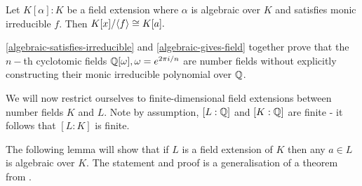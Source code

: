 \begin{lemma}\label{algebraic-gives-field} 
Let $K[\alpha]:K$ be a field extension where $\alpha$ is algebraic over $K$ and satisfies monic irreducible $f$. Then $K[x]/\langle f \rangle \cong K[a].$



\end{lemma}


\begin{remark}
\cref{algebraic-satisfies-irreducible} and \cref{algebraic-gives-field} together prove that the $n-$th cyclotomic fields $\mathbb{Q}[\omega],\omega=e^{2\pi i/n}$ are number fields without explicitly constructing their monic irreducible polynomial over $\mathbb{Q}$. 
\end{remark}

We will now restrict ourselves to finite-dimensional  field extensions between number fields $K$ and $L$. Note by assumption, $[L:\mathbb{Q}]$ and $[K:\mathbb{Q}]$ are finite - it follows that $[L:K]$ is finite.

The following lemma will show that if $L$ is a field extension of $K$ then any $a\in L$ is algebraic over $K$. The statement and proof is a generalisation of a theorem from \cite{NumberFields}.

